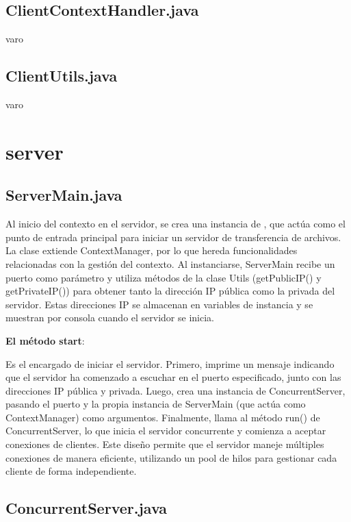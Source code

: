 \documentclass[a4paper, 12pt]{report}
\begin{document}
\section{ClientContextHandler.java}
varo

\section{ClientUtils.java}
varo

\chapter{server}

\section{ServerMain.java}

Al inicio del contexto en el servidor, se crea una instancia de , que actúa como el punto de
entrada principal para iniciar un servidor de transferencia de archivos. La clase extiende ContextManager,
por lo que hereda funcionalidades relacionadas con la gestión del contexto. Al instanciarse, ServerMain recibe
un puerto como parámetro y utiliza métodos de la clase Utils (getPublicIP() y getPrivateIP())
para obtener tanto la dirección IP pública como la privada del
servidor. Estas direcciones IP se almacenan en variables de instancia y se muestran por consola cuando el servidor se inicia.

\textbf{El método start}:

Es el encargado de iniciar el servidor. Primero, imprime un mensaje
indicando que el servidor ha comenzado a escuchar en el puerto
especificado, junto con las direcciones IP pública y privada. Luego,
crea una instancia de ConcurrentServer, pasando el puerto y la propia instancia de ServerMain (que actúa como ContextManager) como argumentos. Finalmente, llama al método run() de ConcurrentServer,
lo que inicia el servidor concurrente y comienza a aceptar conexiones
de clientes. Este diseño permite que el servidor maneje múltiples
conexiones de manera eficiente, utilizando un pool de hilos para
gestionar cada cliente de forma independiente.



\section{ConcurrentServer.java}
\end{document}
